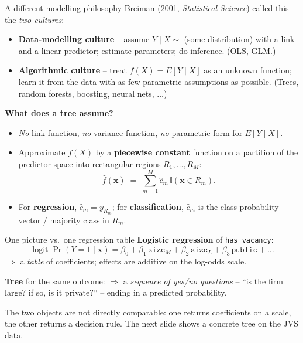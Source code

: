 \documentclass[10pt,ignorenonframetext,aspectratio=169]{beamer}
\newcommand{\bx}{\boldsymbol{x}}
\newcommand{\logit}{\operatorname{logit}}
\begin{document}
\begin{frame}{A different modelling philosophy}
Breiman (2001, \textit{Statistical Science}) called this the \emph{two cultures}:
\begin{itemize}
    \justifying
    \item \textbf{Data-modelling culture} -- assume $Y \mid X \sim$ (some distribution) with a link and a linear predictor; estimate parameters; do inference. (OLS, GLM.)
    \item \textbf{Algorithmic culture} -- treat $f(X) = E[Y \mid X]$ as an unknown function; learn it from the data with as few parametric assumptions as possible. (Trees, random forests, boosting, neural nets, $\ldots$)
\end{itemize}

\medskip
\textbf{What does a tree assume?}
\begin{itemize}
    \justifying
    \item \emph{No} link function, \emph{no} variance function, \emph{no} parametric form for $E[Y \mid X]$.
    \item Approximate $f(X)$ by a \textbf{piecewise constant} function on a partition of the predictor space into rectangular regions $R_1, \ldots, R_M$:
    \[
        \hat f(\bx) \;=\; \sum_{m=1}^{M} \hat c_m \,\mathbb{I}(\bx \in R_m).
    \]
    \item For \textbf{regression}, $\hat c_m = \bar y_{R_m}$; for \textbf{classification}, $\hat c_m$ is the class-probability vector / majority class in $R_m$.
\end{itemize}
\end{frame}


\begin{frame}{One picture vs.\ one regression table}
\textbf{Logistic regression} of \texttt{has\_vacancy}:
\[
\logit \Pr(Y=1 \mid \bx) = \beta_0 + \beta_1 \,\texttt{size}_M + \beta_2 \,\texttt{size}_L + \beta_3 \,\texttt{public} + \ldots
\]
$\Rightarrow$ a \emph{table} of coefficients; effects are additive on the log-odds scale.

\medskip
\textbf{Tree} for the same outcome:
$\Rightarrow$ a \emph{sequence of yes/no questions} -- ``is the firm large? if so, is it private?'' -- ending in a predicted probability.

\medskip
The two objects are \alert{not directly comparable}: one returns coefficients on a scale, the other returns a decision rule. The next slide shows a concrete tree on the JVS data.
\end{frame}
\end{document}

